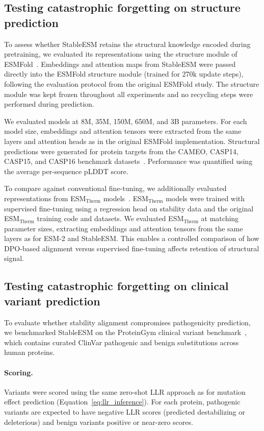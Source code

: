 \subsection{Testing catastrophic forgetting on structure prediction}\label{sec:structure_forgetting}

To assess whether StableESM retains the structural knowledge encoded during pretraining, we evaluated its representations using the structure module of ESMFold~\citep{lin2023evolutionary}.
Embeddings and attention maps from StableESM were passed directly into the ESMFold structure module (trained for 270k update steps), following the evaluation protocol from the original ESMFold study.
The structure module was kept frozen throughout all experiments and no recycling steps were performed during prediction.

We evaluated models at 8M, 35M, 150M, 650M, and 3B parameters.
For each model size, embeddings and attention tensors were extracted from the same layers and attention heads as in the original ESMFold implementation.
Structural predictions were generated for protein targets from the CAMEO, CASP14, CASP15, and CASP16 benchmark datasets~\citep{yuan2025casp16}.
Performance was quantified using the average per-sequence pLDDT score.

To compare against conventional fine-tuning, we additionally evaluated representations from ESM$_{\text{Therm}}$ models~\citep{chu2024protein}.
ESM$_{\text{Therm}}$ models were trained with supervised fine-tuning using a regression head on stability data and the original ESM$_{\text{Therm}}$ training code and datasets.
We evaluated ESM$_{\text{Therm}}$ at matching parameter sizes, extracting embeddings and attention tensors from the same layers as for ESM-2 and StableESM.
This enables a controlled comparison of how DPO-based alignment versus supervised fine-tuning affects retention of structural signal.

\subsection{Testing catastrophic forgetting on clinical variant prediction}\label{sec:clinical_forgetting}

To evaluate whether stability alignment compromises pathogenicity prediction, we benchmarked StableESM on the ProteinGym clinical variant benchmark~\citep{notin2023proteingym}, which contains curated ClinVar pathogenic and benign substitutions across human proteins.

\paragraph{Scoring.}
Variants were scored using the same zero-shot LLR approach as for mutation effect prediction (Equation~\ref{eq:llr_inference}).
For each protein, pathogenic variants are expected to have negative LLR scores (predicted destabilizing or deleterious) and benign variants positive or near-zero scores.

